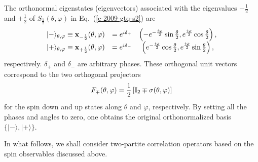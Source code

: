 \documentclass[fleqn,twoside]{article}      %
\begin{document}
The  orthonormal eigenstates (eigenvectors)  associated with the eigenvalues $-\frac{1}{2}$ and $+\frac{1}{2}$ of
$S_\frac{1}{2}(\theta , \varphi )$ in Eq.~(\ref{e-2009-gtq-s2})
are
\begin{equation}
\label{e-2009-gtq-s2ev}
\begin{array}{cccc}
\vert -\rangle_{\theta ,\varphi} \equiv {\bf x}_{-\frac{1}{2}}(\theta ,\varphi)&=e^{i\delta_{+}}& \left(-
e^{-\frac{i\varphi}{2}} \sin{\theta \over 2} ,e^{\frac{i\varphi}{2}}  \cos{\theta \over 2}
\right),\\
\vert +\rangle_{\theta ,\varphi} \equiv {\bf x}_{+\frac{1}{2}}(\theta ,\varphi)&=e^{i\delta_{-}}& \left(
e^{-\frac{i\varphi}{2}} \cos{\theta \over 2}, e^{\frac{i\varphi}{2}}\sin{\theta \over 2}
\right) ,
\end{array}
\end{equation}
respectively. $\delta_{+}$ and $\delta_{-}$ are arbitrary phases.
These orthogonal unit vectors correspond to the two orthogonal projectors
\begin{equation}
\label{e-2009-gtq-s2evproj}
F_\mp (\theta ,\varphi ) =
\frac{1}{2}
\left[
{\Bbb I}_2 \mp \sigma (\theta ,\varphi)
\right]
\end{equation}
for the spin down and up states along $\theta $ and $\varphi$, respectively.
By setting all the phases and angles to zero, one obtains the original
orthonormalized basis $\{\vert -\rangle,\vert +\rangle\}$.

In what follows, we shall consider two-partite correlation operators based on the spin observables discussed above.
\end{document}
